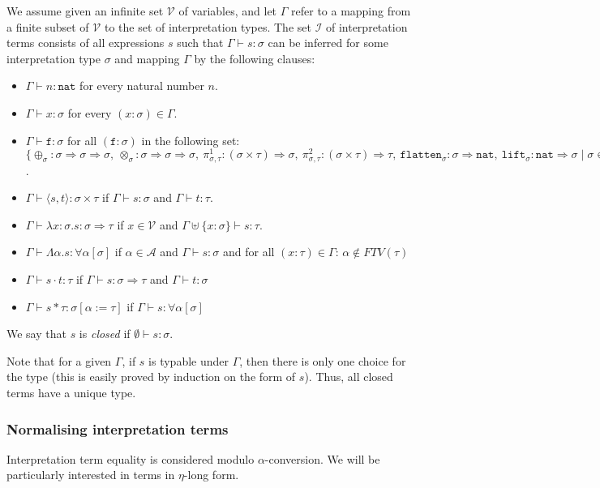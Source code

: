 \documentclass[runningheads,a4paper]{llncs}
\newcommand{\Iterms}{\mathcal{I}}
\newcommand{\Typevars}{\mathcal{A}}
\newcommand{\Vars}{\mathcal{V}}
\newcommand{\ITypes}{\mathcal{Y}}
\newcommand{\quant}[2]{\forall #1[#2]}
\newcommand{\arrtype}{\Rightarrow}
\newcommand{\abs}[2]{\lambda #1.#2}
\newcommand{\tabs}[2]{\Lambda #1.#2}
\newcommand{\app}[2]{#1 \cdot #2}
\newcommand{\tapp}[2]{#1 * #2}
\newcommand{\pair}[2]{\langle #1,#2 \rangle}
\newcommand{\subst}[2]{#1:=#2}
\newcommand{\FTV}{\mathit{FTV}}
\newcommand{\nat}{\mathtt{nat}}
\newcommand{\proj}{\pi}
\newcommand{\flatten}{\mathtt{flatten}}
\newcommand{\lift}{\mathtt{lift}}
\begin{document}
\begin{definition}\label{def_typing}
We assume given an infinite set $\Vars$ of variables, and let $\Gamma$
refer to a mapping from a finite subset of $\Vars$ to the set of
interpretation types.  The set $\Iterms$ of interpretation terms consists
of all expressions $s$ such that $\Gamma \vdash s : \sigma$ can be
inferred for some interpretation type $\sigma$ and mapping $\Gamma$ by
the following clauses:
\begin{itemize}
\item $\Gamma \vdash n : \nat$ for every natural number $n$.
\item $\Gamma \vdash x : \sigma$ for every $(x : \sigma) \in \Gamma$.
\item $\Gamma \vdash \mathtt{f} : \sigma$ for all $(\mathtt{f} :
  \sigma)$ in the following set: $\{ \oplus_\sigma : \sigma \arrtype
  \sigma \arrtype \sigma,\ \otimes_\sigma : \sigma \arrtype \sigma \arrtype
  \sigma,\ \proj^1_{\sigma,\tau} : (\sigma \times \tau) \arrtype
  \sigma,\ \proj^2_{\sigma,\tau} : (\sigma \times \tau) \arrtype \tau,\ 
  \flatten_{\sigma} : \sigma \arrtype \nat,\ 
  \lift_{\sigma} : \nat \arrtype \sigma
  \mid \sigma \in \ITypes \}$.
\item $\Gamma \vdash \pair{s}{t} : \sigma \times \tau$ if $\Gamma \vdash
  s : \sigma$ and $\Gamma \vdash t : \tau$.
\item $\Gamma \vdash \abs{x:\sigma}{s} : \sigma \arrtype \tau$ if $x
  \in \Vars$ and $\Gamma \uplus \{ x : \sigma \} \vdash s : \tau$.
\item $\Gamma \vdash \tabs{\alpha}{s} : \quant{\alpha}{\sigma}$ if
  $\alpha \in \Typevars$ and $\Gamma \vdash s : \sigma$ and for all
  $(x : \tau) \in \Gamma$: $\alpha \notin \FTV(\tau)$
\item $\Gamma \vdash \app{s}{t} : \tau$ if $\Gamma \vdash s :
  \sigma \arrtype \tau$ and $\Gamma \vdash t : \sigma$
\item $\Gamma \vdash \tapp{s}{\tau} : \sigma[\subst{\alpha}{\tau}]$ if
  $\Gamma \vdash s : \quant{\alpha}{\sigma}$
\end{itemize}
We say that $s$ is \emph{closed} if $\emptyset \vdash s : \sigma$.
\end{definition}

Note that for a given $\Gamma$, if $s$ is typable under $\Gamma$, then
there is only one choice for the type (this is easily proved by
induction on the form of $s$). Thus, all closed terms have a unique
type.

\subsubsection{Normalising interpretation terms}
Interpretation term equality is considered modulo $\alpha$-conversion.
We will be particularly interested in terms in $\eta$-long form.
\end{document}
